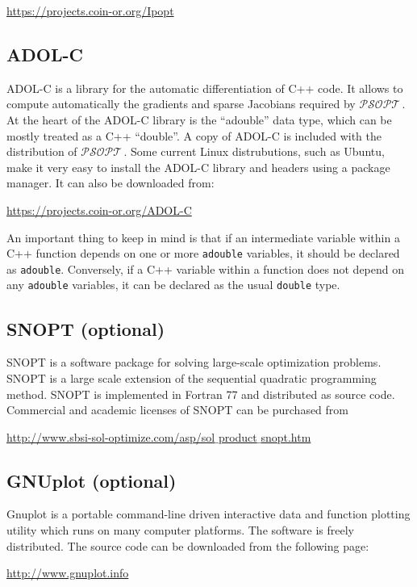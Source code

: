 \documentclass[a4paper,11pt]{report}    %
\newcommand{\psopt}{$\mathcal{PSOPT}$\,}  %
\begin{document}
\href{https://projects.coin-or.org/Ipopt}{https://projects.coin-or.org/Ipopt}

\subsection{ADOL-C}
ADOL-C is a library for the automatic differentiation of C++ code. It allows to compute automatically the gradients and sparse Jacobians
required by \psopt. At the heart of the ADOL-C library is the ``adouble'' data type, which can be mostly treated as a C++ ``double''. A copy of ADOL-C is included with the distribution
of \psopt. Some current Linux distrubutions, such as Ubuntu, make it very easy to install the ADOL-C library and headers using a package manager. It can also be downloaded from:

\href{https://projects.coin-or.org/ADOL-C}{https://projects.coin-or.org/ADOL-C}

An important thing to keep in mind is that if an intermediate variable within a C++ function depends on one or more \texttt{adouble} variables, it should
be declared as \texttt{adouble}. Conversely, if a C++ variable within a function does not depend on any \texttt{adouble} variables, it can be declared as the usual
\texttt{double} type.


\subsection{SNOPT (optional)}
SNOPT \cite{Gill:01} is a software package for solving large-scale optimization problems. SNOPT is a large scale extension of the sequential quadratic programming method.
SNOPT is implemented in Fortran 77 and distributed as source code. Commercial and academic licenses of SNOPT can be purchased from 

\href{http://www.sbsi-sol-optimize.com/asp/sol$\_$product$\_$snopt.htm}{http://www.sbsi-sol-optimize.com/asp/sol$\_$product$\_$snopt.htm}



\subsection{GNUplot (optional)}
Gnuplot  is a portable command-line driven interactive data and function plotting utility which runs
on many computer platforms. The software is freely distributed. The source code can be downloaded
from the following page:

\href{http://www.gnuplot.info}{http://www.gnuplot.info}
\end{document}
